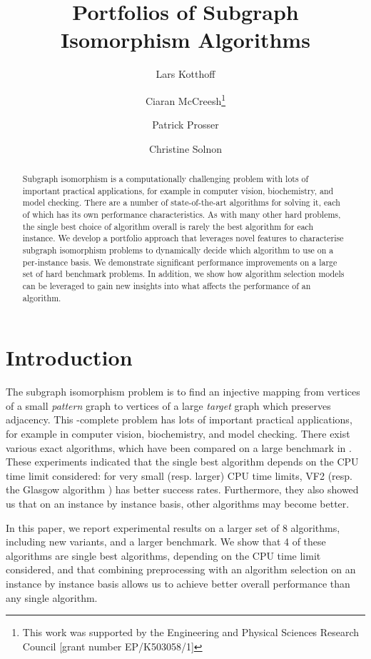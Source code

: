 \documentclass{llncs}
\title{Portfolios of Subgraph Isomorphism Algorithms}
\author{
    Lars Kotthoff\inst{1}
    \and Ciaran McCreesh\thanks{This work was supported by the Engineering
        and Physical Sciences Research Council [grant number EP/K503058/1]}\inst{2}
    \and Patrick Prosser\inst{2}
    \and Christine Solnon\inst{3}}
\institute{
    University of British Columbia, Vancouver, Canada
    \and University of Glasgow, Glasgow, Scotland
    \and INSA-Lyon, LIRIS, UMR5205, F-69621, France}
\begin{document}
\maketitle

\begin{abstract}
Subgraph isomorphism is a computationally challenging problem with lots of important practical
applications, for example in computer vision, biochemistry, and model checking. There are a number
of state-of-the-art algorithms for solving it, each of which has its own performance
characteristics. As with many other hard problems, the single best choice of algorithm overall is
rarely the best algorithm for each instance. We develop a portfolio approach that leverages novel
features to characterise subgraph isomorphism problems to dynamically decide which algorithm to use
on a per-instance basis. We demonstrate significant performance improvements on a large set of hard
benchmark problems. In addition, we show how algorithm selection models can be leveraged to gain new
insights into what affects the performance of an algorithm.
\end{abstract}

\section{Introduction}

The subgraph isomorphism problem is to find an injective mapping from vertices of a small
\emph{pattern} graph to vertices of a large \emph{target} graph which preserves adjacency. This
\NP-complete problem has lots of important practical applications, for example in computer vision,
biochemistry, and model checking. There exist various exact algorithms, which have been compared on
a large benchmark in  \cite{McCreesh:2015}. These experiments indicated that the single best
algorithm depends on the CPU time limit considered: for very small (resp. larger) CPU time limits,
VF2 \cite{Cordella:2004} (resp. the Glasgow algorithm \cite{McCreesh:2015}) has better success
rates. Furthermore, they also showed us that on an instance by instance basis, other algorithms may
become better.

In this paper, we report experimental results on a larger set of 8 algorithms, including new
variants, and a larger benchmark. We show that 4 of these algorithms are single best algorithms,
depending on the CPU time limit considered, and that combining preprocessing with an algorithm
selection on an instance by instance basis allows us to achieve better overall performance than any
single algorithm.
\end{document}
